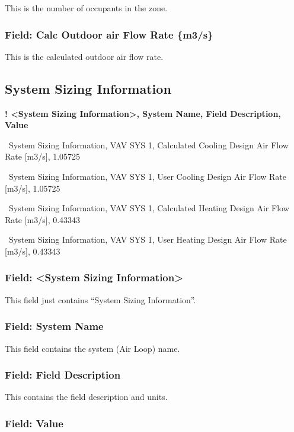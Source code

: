 This is the number of occupants in the zone.

\subsubsection{Field: Calc Outdoor air Flow Rate \{m3/s\}}\label{field-calc-outdoor-air-flow-rate-m3s}

This is the calculated outdoor air flow rate.

\subsection{System Sizing Information}\label{system-sizing-information}

\textbf{! \textless{}System Sizing Information\textgreater{}, System Name, Field Description, Value}

~System Sizing Information, VAV SYS 1, Calculated Cooling Design Air Flow Rate {[}m3/s{]}, 1.05725

~System Sizing Information, VAV SYS 1, User Cooling Design Air Flow Rate {[}m3/s{]}, 1.05725

~System Sizing Information, VAV SYS 1, Calculated Heating Design Air Flow Rate {[}m3/s{]}, 0.43343

~System Sizing Information, VAV SYS 1, User Heating Design Air Flow Rate {[}m3/s{]}, 0.43343

\subsubsection{Field: \textless{}System Sizing Information\textgreater{}}\label{field-system-sizing-information}

This field just contains ``System Sizing Information''.

\subsubsection{Field: System Name}\label{field-system-name}

This field contains the system (Air Loop) name.

\subsubsection{Field: Field Description}\label{field-field-description}

This contains the field description and units.

\subsubsection{Field: Value}\label{field-value-1}

